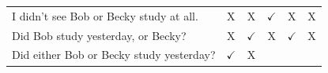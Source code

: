 \documentclass[oneside]{report}
\theoremstyle{definition}
\theoremstyle{definition}
\theoremstyle{definition}
\theoremstyle{remark}
\begin{document}
\begin{longtable}[]{@{}lccccc@{}}
\begin{minipage}[t]{0.47\columnwidth}\raggedright\strut
I didn't see Bob or Becky study at all.\strut
\end{minipage} & \begin{minipage}[t]{0.05\columnwidth}\centering\strut
X\strut
\end{minipage} & \begin{minipage}[t]{0.05\columnwidth}\centering\strut
X\strut
\end{minipage} & \begin{minipage}[t]{0.05\columnwidth}\centering\strut
\(\checkmark\)\strut
\end{minipage} & \begin{minipage}[t]{0.09\columnwidth}\centering\strut
X\strut
\end{minipage} & \begin{minipage}[t]{0.12\columnwidth}\centering\strut
X\strut
\end{minipage}\tabularnewline
\begin{minipage}[t]{0.47\columnwidth}\raggedright\strut
Did Bob study yesterday, or Becky?\strut
\end{minipage} & \begin{minipage}[t]{0.05\columnwidth}\centering\strut
X\strut
\end{minipage} & \begin{minipage}[t]{0.05\columnwidth}\centering\strut
\(\checkmark\)\strut
\end{minipage} & \begin{minipage}[t]{0.05\columnwidth}\centering\strut
X\strut
\end{minipage} & \begin{minipage}[t]{0.09\columnwidth}\centering\strut
\(\checkmark\)\strut
\end{minipage} & \begin{minipage}[t]{0.12\columnwidth}\centering\strut
X\strut
\end{minipage}\tabularnewline
\begin{minipage}[t]{0.47\columnwidth}\raggedright\strut
Did either Bob or Becky study yesterday?\strut
\end{minipage} & \begin{minipage}[t]{0.05\columnwidth}\centering\strut
\(\checkmark\)\strut
\end{minipage} & \begin{minipage}[t]{0.05\columnwidth}\centering\strut
X\strut
\end{minipage} & \begin{minipage}[t]{0.05\columnwidth}\centering\strut

\end{minipage}
\end{longtable}
\end{document}
